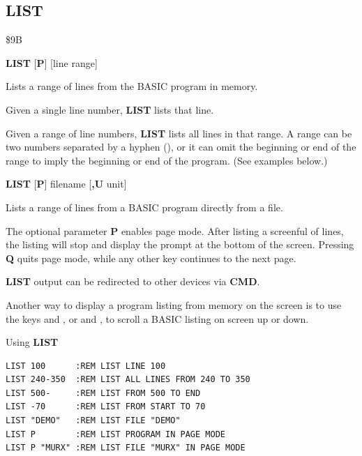 \label{BASIC 65 Commands!LIST}
\newpage
\subsection{LIST}
\begin{description}[leftmargin=2cm,style=nextline]
\item [Token:] \$9B
\item [Format:] {\bf LIST} [{\bf P}] [line range]
\item [Usage:] Lists a range of lines from the BASIC program in memory.

               Given a single line number, {\bf LIST} lists that line.

               Given a range of line numbers, {\bf LIST} lists all lines in
               that range. A range can be two numbers separated by a hyphen
               (\screentext{-}), or it can omit the beginning or end of the
               range to imply the beginning or end of the program. (See
               examples below.)

\item [Format:] {\bf LIST} [{\bf P}] filename [{\bf,U} unit]
\item [Usage:] Lists a range of lines from a BASIC program directly from a file.

\item [Remarks:]
                The optional parameter {\bf P} enables page mode. After
                listing a screenful of lines, the listing will stop and
                display the prompt \screentext{[MORE]} at the bottom of the
                screen. Pressing {\bf Q} quits page mode, while any other key
                continues to the next page.

                {\bf LIST} output can be redirected
                to other devices via {\bf CMD}.

                Another way to display a program listing from memory on the screen is to use the keys  and , or
                   and
                  ,
                to scroll a BASIC listing on screen up or down.

\item [Examples:] Using {\bf LIST}
\begin{tcolorbox}[colback=black,coltext=white]
\verbatimfont{\codefont}
\begin{verbatim}
LIST 100      :REM LIST LINE 100
LIST 240-350  :REM LIST ALL LINES FROM 240 TO 350
LIST 500-     :REM LIST FROM 500 TO END
LIST -70      :REM LIST FROM START TO 70
LIST "DEMO"   :REM LIST FILE "DEMO"
LIST P        :REM LIST PROGRAM IN PAGE MODE
LIST P "MURX" :REM LIST FILE "MURX" IN PAGE MODE
\end{verbatim}
\end{tcolorbox}
\end{description}

